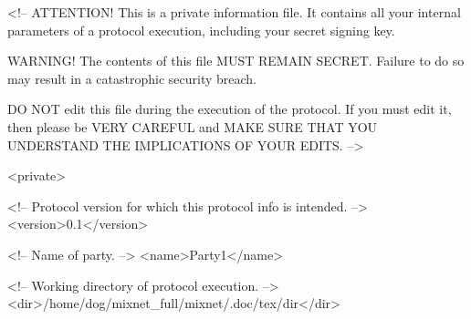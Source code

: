 
<!-- ATTENTION! This is a private information file. It contains all 
     your internal parameters of a protocol execution, including 
     your secret signing key.
     
     WARNING! The contents of this file MUST REMAIN SECRET. Failure 
     to do so may result in a catastrophic security breach.
     
     DO NOT edit this file during the execution of the protocol. If 
     you must edit it, then please be VERY CAREFUL and MAKE SURE 
     THAT YOU UNDERSTAND THE IMPLICATIONS OF YOUR EDITS. -->

<private>

   <!-- Protocol version for which this protocol info is intended. -->
   <version>0.1</version>

   <!-- Name of party. -->
   <name>Party1</name>

   <!-- Working directory of protocol execution. -->
   <dir>/home/dog/mixnet_full/mixnet/.doc/tex/dir</dir>

